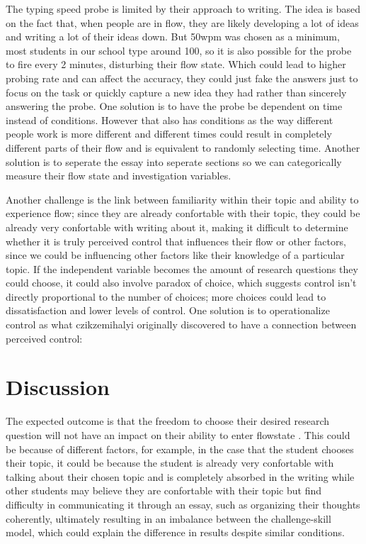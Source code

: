 \documentclass{article}
\begin{document}
The typing speed probe is limited by their approach to writing. The idea is based on the fact that, when people are in flow, they are likely developing a lot of ideas and writing a lot of their ideas down. But 50wpm was chosen as a minimum, most students in our school type around 100, so it is also possible for the probe to fire every 2 minutes, disturbing their flow state. Which could lead to higher probing rate and can affect the accuracy, they could just fake the answers just to focus on the task or quickly capture a new idea they had rather than sincerely answering the probe. One solution is to have the probe be dependent on time instead of conditions. However that also has conditions as the way different people work is more different and different times could result in completely different parts of their flow and is equivalent to randomly selecting time. Another solution is to seperate the essay into seperate sections so we can categorically measure their flow state and investigation variables.

Another challenge is the link between familiarity within their topic and ability to experience flow; since they are already confortable with their topic, they could be already very confortable with writing about it, making it difficult to determine whether it is truly perceived control that influences their flow or other factors, since we could be influencing other factors like their knowledge of a particular topic. If the independent variable becomes the amount of research questions they could choose, it could also involve paradox of choice, which suggests control isn't directly proportional to the number of choices; more choices could lead to dissatisfaction and lower levels of control. One solution is to operationalize control as what czikzemihalyi originally discovered to have a connection between perceived control: %

\section{Discussion}

The expected outcome is that the freedom to choose their desired research question will not have an impact on their ability to enter flowstate \parencite{AINLEY2008109}. This could be because of different factors, for example, in the case that the student chooses their topic, it could be because the student is already very confortable with talking about their chosen topic and is completely absorbed in the writing while other students may believe they are confortable with their topic but find difficulty in communicating it through an essay, such as organizing their thoughts coherently, ultimately resulting in an imbalance between the challenge-skill model, which could explain the difference in results despite similar conditions.
    
\end{document}
